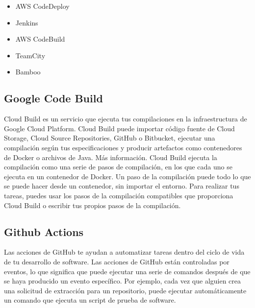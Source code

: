 \documentclass[12pt,letterpaper]{article}
\begin{document}
\begin{itemize}
    \item AWS CodeDeploy
    \item Jenkins
    \item AWS CodeBuild
    \item TeamCity
    \item Bamboo

\end{itemize}
\subsection{Google Code Build}

Cloud Build es un servicio que ejecuta tus compilaciones en la infraestructura de Google Cloud Platform. Cloud Build puede importar código fuente de Cloud Storage, Cloud Source Repositories, GitHub o Bitbucket, ejecutar una compilación según tus especificaciones y producir artefactos como contenedores de Docker o archivos de Java. Más información.
Cloud Build ejecuta la compilación como una serie de pasos de compilación, en los que cada uno se ejecuta en un contenedor de Docker. Un paso de la compilación puede todo lo que se puede hacer desde un contenedor, sin importar el entorno. Para realizar tus tareas, puedes usar los pasos de la compilación compatibles que proporciona Cloud Build o escribir tus propios pasos de la compilación.

\subsection{Github Actions}

Las acciones de GitHub te ayudan a 
automatizar tareas dentro del ciclo de vida de 
tu desarrollo de software. Las acciones de GitHub 
están controladas por eventos, lo que significa que puede
 ejecutar una serie de comandos después de que se haya producido 
 un evento específico. Por ejemplo, cada vez que alguien crea una 
 solicitud de extracción para un repositorio, puede ejecutar
  automáticamente un comando que ejecuta un script de prueba de software.
\end{document}
